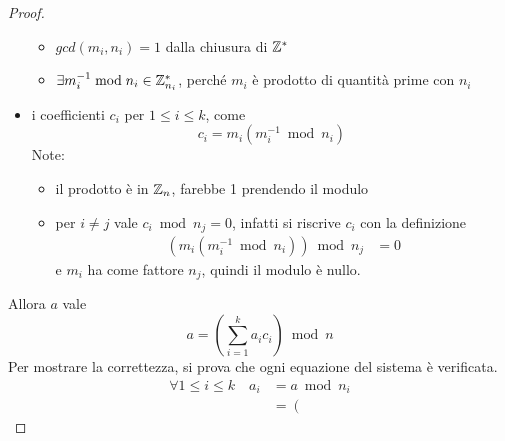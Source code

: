 \begin{proof}
\begin{itemize}
\begin{itemize}[noitemsep,parsep=0pt,partopsep=0pt,topsep=0pt]
                \item $
                    gcd(m_i, n_i) = 1
                    $ dalla chiusura di $\mathbb{Z}_{}^{*} $
                \item $
                    \exists
                    m_i^{-1}
                    \bmod n_i
                    \in
                    \mathbb{Z}_{n_i}^{*} 
                    $, perché $m_i$ è prodotto di quantità prime con $n_i$
            \end{itemize}
        \item i coefficienti $
            c_i
            $ per $
            1 \leq i \leq k
            $, come
            \begin{equation*}
                c_i =
                m_i \left( 
                    m_i^{-1}
                    \bmod n_i
                \right)
            \end{equation*}
            Note:
            \begin{itemize}
                \item il prodotto è in $
                    \mathbb{Z}_{n} 
                    $, farebbe 1 prendendo il modulo
                \item per $i \ne j$ vale
                    $
                        c_i \bmod n_j = 0
                    $, infatti si riscrive $c_i$ con la definizione
                    \begin{align*}
                        \left( 
                            m_i \left( 
                                m_i^{-1}
                                \bmod n_i
                            \right)
                        \right)
                        \bmod n_j
                        &= 0
                    \end{align*}
                    e $m_i$ ha come fattore $n_j$, quindi il modulo è nullo.
            \end{itemize}
    \end{itemize}
    Allora $a$ vale
    \begin{equation*}
        a = 
        \left( 
            \sum_{i=1}^{k} a_i c_i
        \right) \bmod n 
    \end{equation*}
    Per mostrare la correttezza, si prova che ogni equazione del sistema è verificata.
    \begin{align*}
        \forall 1 \leq i \leq k
        \quad
        a_i
        &=
        a \bmod n_i
        \\
        &=
        \left( 

\end{align*}
\end{proof}
